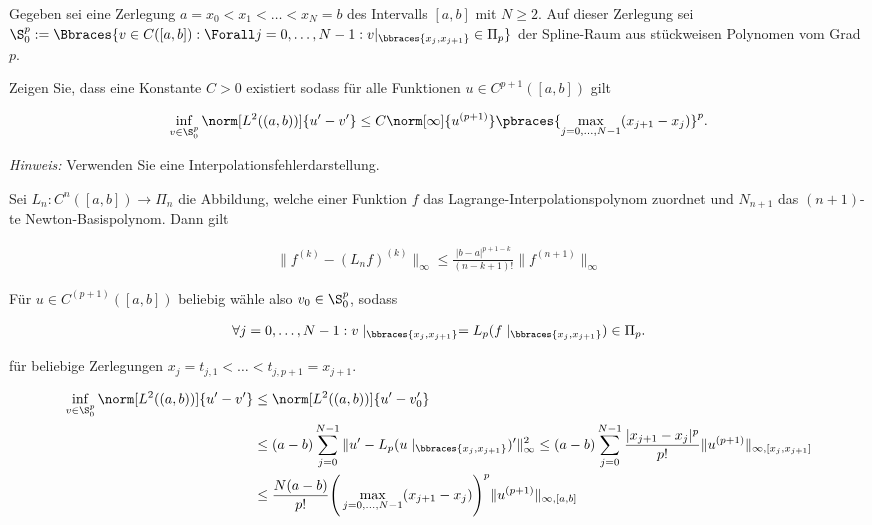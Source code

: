 
\begin{exercise}

Gegeben sei eine Zerlegung $a = x_0 < x_1 < \dots < x_N = b$ des Intervalls $[a, b]$ mit $N \geq 2$.
Auf dieser Zerlegung sei $\S_0^p := \Bbraces{v \in C([a, b]): \Forall j = 0, \dots, N-1 : v|_{\bbraces{x_j, x_{j+1}}} \in \Pi_p}$ der Spline-Raum aus stückweisen Polynomen vom Grad $p$.

Zeigen Sie, dass eine Konstante $C > 0$ existiert sodass für alle Funktionen $u \in C^{p+1}([a, b])$ gilt

\begin{align}
  \inf_{v \in \S^p_0}
  \norm[L^2((a, b))]{u^\prime - v^\prime}
  \leq
  C \norm[\infty]{u^{(p+1)}}
  \pbraces
  {
    \max_{j=0, \dots, N-1}
    (x_{j+1} - x_j)
  }^p.
\end{align}

\textit{Hinweis:}
Verwenden Sie eine Interpolationsfehlerdarstellung.

\end{exercise}


\begin{solution}

Sei $L_n: C^n([a,b]) \to \Pi_n$ die Abbildung, welche einer Funktion $f$ das Lagrange-Interpolationspolynom zuordnet und $N_{n+1}$ das $(n+1)$-te Newton-Basispolynom.
Dann gilt

\begin{align*}
  \|f^{(k)} - (L_nf)^{(k)}\|_{\infty} \leq \frac{|b-a|^{p+1-k}}{(n-k+1)!}\|f^{(n+1)}\|_{\infty}
\end{align*}

Für $u \in C^{(p+1)}([a,b])$ beliebig wähle also $v_0 \in \S_0^p$, sodass

\begin{align*}
  \forall j = 0,\dots,N-1: v\mid_{\bbraces{x_j , x_{j+1}}} = L_p(f\mid_{\bbraces{x_j , x_{j+1}}}) \in \Pi_p.
\end{align*}

für beliebige Zerlegungen $x_j = t_{j,1} < \dots < t_{j,p+1} = x_{j+1}$.

\begin{align*}
  \inf_{v\in \S^p_0} \norm[L^2((a,b))]{u^\prime - v^\prime} &\leq \norm[L^2((a,b))]{u^\prime - v_0^\prime} \\
  &\leq (a-b)\sum_{j=0}^{N-1}\|u^{\prime} - L_p(u\mid_{\bbraces{x_j , x_{j+1}}})^{\prime}\|_{\infty}^2
  \leq (a-b)\sum_{j=0}^{N-1}\frac{|x_{j+1} - x_j|^{p}}{p!}\|u^{(p+1)}\|_{\infty,[x_j,x_{j+1}]} \\
  &\leq \frac{N(a-b)}{p!}\Bigg( \max_{j=0, \dots, N-1} (x_{j+1} - x_j)\Bigg)^p\|u^{(p+1)}\|_{\infty,[a,b]}
\end{align*}

\end{solution}

